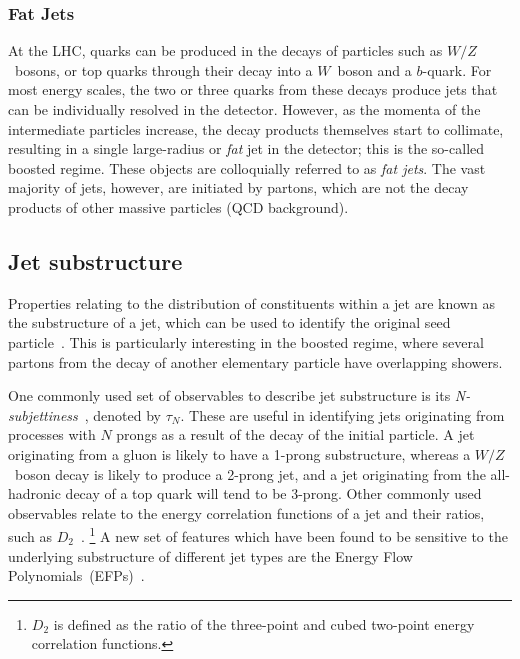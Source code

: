 \subsubsection{Fat Jets}
At the LHC, quarks can be produced in the decays of particles such as $W/Z$~bosons, or top quarks through their decay into a $W$~boson and a $b$-quark.
For most energy scales, the two or three quarks from these decays produce jets that can be individually resolved in the detector.
However, as the momenta of the intermediate particles increase, the decay products themselves start to collimate, resulting in a single large-radius or \textit{fat} jet in the detector; this is the so-called boosted regime.
These objects are colloquially referred to as \textit{fat jets}.
The vast majority of jets, however, are initiated by partons, which are not the decay products of other massive particles (QCD background).

\subsection{Jet substructure}
\label{sec:jet_substructure}

Properties relating to the distribution of constituents within a jet are known as the substructure of a jet, which can be used to identify the original seed particle~\cite{Kogler:2018hem}.
This is particularly interesting in the boosted regime, where several partons from the decay of another elementary particle have overlapping showers.

One commonly used set of observables to describe jet substructure is its \emph{N-subjettiness}~\cite{Thaler_2011}, denoted by ${\tau_N}$.
These are useful in identifying jets originating from processes with $N$ prongs as a result of the decay of the initial particle.
A jet originating from a gluon is likely to have a 1-prong substructure, whereas a $W/Z$~boson decay is likely to produce a 2-prong jet, and a jet originating from the all-hadronic decay of a top quark will tend to be 3-prong.
Other commonly used observables relate to the energy correlation functions of a jet and their ratios, such as $D_2$~\cite{Larkoski_2013,Larkoski_2014}.%
\footnote{$D_2$ is defined as the ratio of the three-point and cubed two-point energy correlation functions.}
A new set of features which have been found to be sensitive to the underlying substructure of different jet types are the Energy Flow Polynomials~(EFPs)~\cite{Komiske_2018}.

